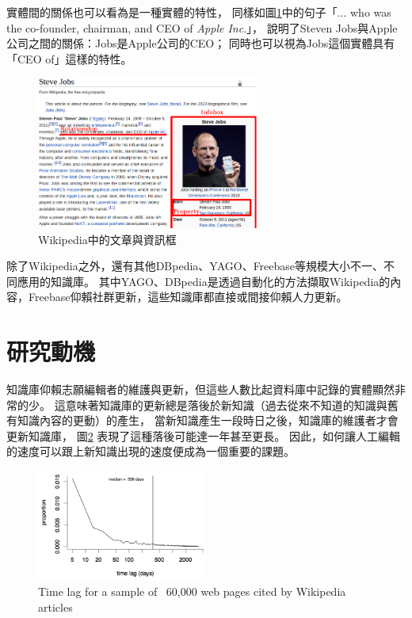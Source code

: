 實體間的關係也可以看為是一種實體的特性，
同樣如圖\ref{i:wiki}中的句子「... who was the co-founder, chairman, and CEO of \emph{Apple Inc}.」，
說明了Steven Jobs與Apple公司之間的關係：Jobs是Apple公司的CEO；
同時也可以視為Jobs這個實體具有「CEO of」這樣的特性。

\begin{figure}
\centering
\includegraphics[width=0.65\textwidth]{images/01-wiki-as-kb}
\caption{Wikipedia中的文章與資訊框}
\label{i:wiki}
\end{figure}

除了Wikipedia之外，還有其他DBpedia\citep{dbpedia}、YAGO\citep{yago}、Freebase\citep{freebase}等規模大小不一、不同應用的知識庫。
其中YAGO、DBpedia是透過自動化的方法擷取Wikipedia的內容，Freebase仰賴社群更新，這些知識庫都直接或間接仰賴人力更新。  %

%
%
\section{研究動機}
知識庫仰賴志願編輯者的維護與更新，但這些人數比起資料庫中記錄的實體顯然非常的少。
這意味著知識庫的更新總是落後於新知識（過去從來不知道的知識與舊有知識內容的更動）的產生，
當新知識產生一段時日之後，知識庫的維護者才會更新知識庫，
圖\ref{i:wikicitenews} \citep{kba2012}表現了這種落後可能達一年甚至更長。
因此，如何讓人工編輯的速度可以跟上新知識出現的速度便成為一個重要的課題。

\begin{figure}
    \centering
    \includegraphics[width=0.5\textwidth]{images/01-wiki-cite-delay}
    \caption{Time lag for a sample of ~60,000 web pages cited by Wikipedia articles}
    \label{i:wikicitenews}
\end{figure}

